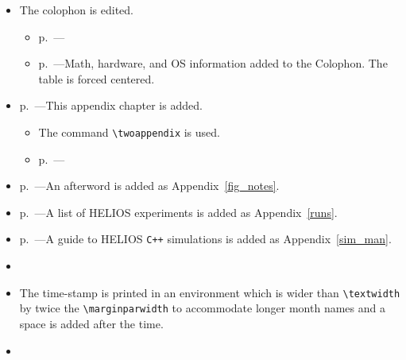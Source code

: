 \begin{spacing}{1.55}
\begin{itemize}
	\item The colophon is edited.
		\vspace{-4pt}	
	  \begin{itemize}
	  \setlength{\itemsep}{-2pt}
	  	\item p.~\pageref{colo}---
			\item p.~\pageref{colo}---Math, hardware, and OS information added to the Colophon.  The table is forced centered.
		\end{itemize}
	\item p.~\pageref{changes}---This appendix chapter is added.
	 \vspace{-4pt}	
	  \begin{itemize}
	  \setlength{\itemsep}{-2pt}
	    \item The command \verb|\twoappendix| is used.
	    \item p.~\pageref{field_map_data}---
    \end{itemize}
    \item p.~\pageref{fig_notes}---An afterword is added as Appendix~\ref{fig_notes}.
		\item p.~\pageref{runs}---A list of HELIOS experiments is added as Appendix~\ref{runs}.  
	\item p.~\pageref{sim_man}---A guide to HELIOS \texttt{C++} simulations is added as Appendix~\ref{sim_man}. 
		
	
	
	\item {}
	\item The time-stamp is printed in an environment which is wider than \verb|\textwidth| by twice the \verb|\marginparwidth| to accommodate longer month names and a space is added after the time.
	\item {}

\end{itemize}
\end{spacing}
